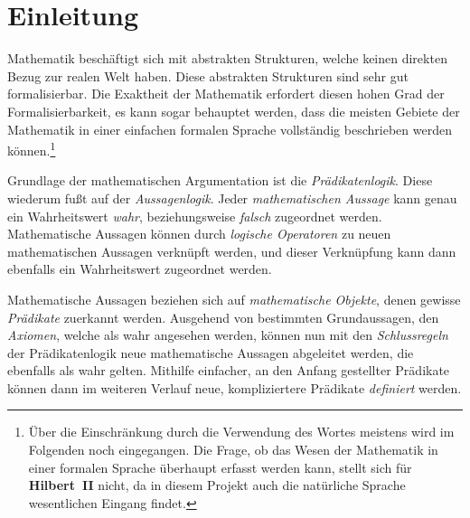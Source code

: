\documentclass[a4paper,german,10pt,twoside]{book}
\begin{document}
\chapter*{Einleitung}
 Mathematik besch{\"a}ftigt sich mit abstrakten Strukturen,
welche keinen direkten Bezug zur {\glqq realen\grqq} Welt haben. Diese abstrakten Strukturen sind
sehr gut formalisierbar. Die Exaktheit der Mathematik erfordert diesen hohen Grad der
Formalisierbarkeit, es kann sogar behauptet werden, dass die meisten Gebiete der Mathematik in
einer einfachen formalen Sprache vollst{\"a}ndig beschrieben werden k{\"o}nnen.\footnote{{\"U}ber die
Einschr{\"a}nkung durch die Verwendung des Wortes {\glqq meistens\grqq} wird im Folgenden noch
eingegangen. Die Frage, ob das Wesen der Mathematik in einer formalen Sprache {\"u}berhaupt erfasst
werden kann, stellt sich f{\"u}r \textbf{Hilbert~II} nicht, da in diesem Projekt auch die nat{\"u}rliche
Sprache wesentlichen Eingang findet.}
\par
Grundlage der mathematischen Argumentation ist die \emph{Pr{\"a}dikatenlogik}. Diese wiederum fu{\ss}t auf
der \emph{Aussagenlogik}. Jeder \emph{mathematischen Aussage} kann genau ein Wahrheitswert
\emph{wahr}, beziehungsweise \emph{falsch} zugeordnet werden. Mathematische Aussagen k{\"o}nnen durch
\emph{logische Operatoren} zu neuen mathematischen Aussagen verkn{\"u}pft werden, und dieser
Verkn{\"u}pfung kann dann ebenfalls ein Wahrheitswert zugeordnet werden.
\par
Mathematische Aussagen beziehen sich auf \emph{mathematische Objekte}, denen gewisse
\emph{Pr{\"a}dikate} zuerkannt werden. Ausgehend von bestimmten Grundaussagen, den \emph{Axiomen},
welche als wahr angesehen werden, k{\"o}nnen nun mit den \emph{Schlussregeln} der Pr{\"a}dikatenlogik neue
mathematische Aussagen abgeleitet werden, die ebenfalls als wahr gelten. Mithilfe einfacher, an den
Anfang gestellter Pr{\"a}dikate k{\"o}nnen dann im weiteren Verlauf neue, kompliziertere Pr{\"a}dikate
\emph{definiert} werden.
\end{document}
